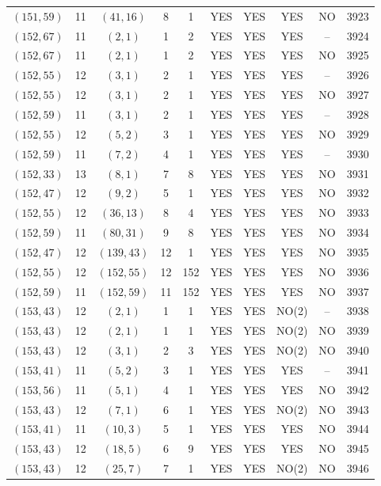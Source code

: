 \begin{longtable}{|c|c|c|c|c|c|c|c|c|c|}
$(151, 59)$ & 11 & $(41, 16)$ & 8 & 1 & YES & YES & YES & NO & 3923\\
$(152, 67)$ & 11 & $(2, 1)$ & 1 & 2 & YES & YES & YES & -- & 3924\\
$(152, 67)$ & 11 & $(2, 1)$ & 1 & 2 & YES & YES & YES & NO & 3925\\
$(152, 55)$ & 12 & $(3, 1)$ & 2 & 1 & YES & YES & YES & -- & 3926\\
$(152, 55)$ & 12 & $(3, 1)$ & 2 & 1 & YES & YES & YES & NO & 3927\\
$(152, 59)$ & 11 & $(3, 1)$ & 2 & 1 & YES & YES & YES & -- & 3928\\
$(152, 55)$ & 12 & $(5, 2)$ & 3 & 1 & YES & YES & YES & NO & 3929\\
$(152, 59)$ & 11 & $(7, 2)$ & 4 & 1 & YES & YES & YES & -- & 3930\\
$(152, 33)$ & 13 & $(8, 1)$ & 7 & 8 & YES & YES & YES & NO & 3931\\
$(152, 47)$ & 12 & $(9, 2)$ & 5 & 1 & YES & YES & YES & NO & 3932\\
$(152, 55)$ & 12 & $(36, 13)$ & 8 & 4 & YES & YES & YES & NO & 3933\\
$(152, 59)$ & 11 & $(80, 31)$ & 9 & 8 & YES & YES & YES & NO & 3934\\
$(152, 47)$ & 12 & $(139, 43)$ & 12 & 1 & YES & YES & YES & NO & 3935\\
$(152, 55)$ & 12 & $(152, 55)$ & 12 & 152 & YES & YES & YES & NO & 3936\\
$(152, 59)$ & 11 & $(152, 59)$ & 11 & 152 & YES & YES & YES & NO & 3937\\
$(153, 43)$ & 12 & $(2, 1)$ & 1 & 1 & YES & YES & NO(2) & -- & 3938\\
$(153, 43)$ & 12 & $(2, 1)$ & 1 & 1 & YES & YES & NO(2) & NO & 3939\\
$(153, 43)$ & 12 & $(3, 1)$ & 2 & 3 & YES & YES & NO(2) & NO & 3940\\
$(153, 41)$ & 11 & $(5, 2)$ & 3 & 1 & YES & YES & YES & -- & 3941\\
$(153, 56)$ & 11 & $(5, 1)$ & 4 & 1 & YES & YES & YES & NO & 3942\\
$(153, 43)$ & 12 & $(7, 1)$ & 6 & 1 & YES & YES & NO(2) & NO & 3943\\
$(153, 41)$ & 11 & $(10, 3)$ & 5 & 1 & YES & YES & YES & NO & 3944\\
$(153, 43)$ & 12 & $(18, 5)$ & 6 & 9 & YES & YES & YES & NO & 3945\\
$(153, 43)$ & 12 & $(25, 7)$ & 7 & 1 & YES & YES & NO(2) & NO & 3946\\

\end{longtable}
